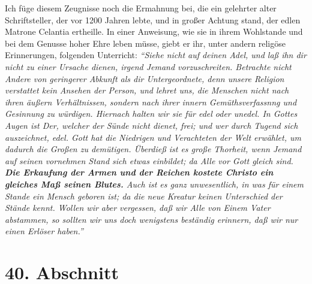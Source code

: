 Ich füge diesem Zeugnisse noch die Ermahnung bei, die ein gelehrter alter
Schriftsteller, der vor 1200 Jahren lebte, und in großer Achtung stand, der
edlen Matrone Celantia ertheille. In einer Anweisung, wie sie in ihrem
Wohlstande und bei dem Genusse hoher Ehre leben müsse, giebt er ihr, unter
andern religöse Erinnerungen, folgenden Unterricht:
\textit{"`Siehe nicht auf deinen
Adel, und laß ihn dir nicht zu einer Ursache dienen, irgend Jemand
vorzuschreiten. Betrachte nicht Andere von geringerer Abkunft als dir
Untergeordnete, denn unsere Religion verstattet kein Ansehen der Person, und
lehret uns, die Menschen nicht nach ihren äußern Verhältnissen, sondern nach
ihrer innern Gemüthsverfassnng und Gesinnung zu würdigen. Hiernach halten wir
sie für edel oder unedel. In Gottes Augen ist Der, welcher der Sünde nicht
dienet, frei; und wer durch Tugend sich auszeichnet, edel. Gott hat die
Niedrigen und Verachteten der Welt erwählet, um dadurch die Großen zu demütigen.
Überdieß ist es große Thorheit, wenn Jemand auf seinen vornehmen Stand sich
etwas einbildet; da Alle vor Gott gleich sind. \textbf{Die Erkaufung der Armen und der
Reichen kostete Christo ein gleiches Maß seinen Blutes.} Auch ist es ganz
unwesentlich, in was für einem Stande ein Mensch geboren ist; da die neue
Kreatur keinen Unterschied der Stände kennt. Wollen wir aber vergessen, daß wir
Alle von Einem Vater abstammen, so sollten wir uns doch wenigstens beständig
erinnern, daß wir nur einen Erlöser haben."'}

\section{40. Abschnitt} \label{kap9_ab40}


